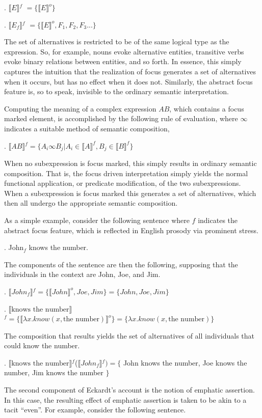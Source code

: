 \documentclass[12pt]{article}
\theoremstyle{definition} \newtheorem{definition}{Definition}
\newcommand{\la}{\ensuremath{\lambda}}
\newcommand{\inter}[1]{\ensuremath{\llbracket#1\rrbracket}}
\begin{document}
\ex. \inter{E}$^f$ $= \{\inter{E}^o\} $

\ex. \inter{E_f}$^f$ $= \{\inter{E}^o, F_1, F_2, F_3...\} $

The set of alternatives is restricted to be of the same logical type as the expression. So, for example, nouns evoke alternative entities, transitive verbs evoke binary relations between entities, and so forth. In essence, this simply captures the intuition that the realization of focus generates a set of alternatives when it occurs, but has no effect when it does not. Similarly, the abstract focus feature is, so to speak, invisible to the ordinary semantic interpretation.

Computing the meaning of a complex expression $AB$, which contains a focus marked element, is accomplished by the following  rule of evaluation, where $\infty$ indicates a suitable method of semantic composition, 

\ex. \inter{AB}$^f = \{ A_i \infty B_j | A_i \in \inter{A}^f, B_j \in \inter{B}^f \} $

When no subexpression is focus marked, this simply results in ordinary semantic composition. That is, the focus driven interpretation simply yields the normal functional application, or predicate modification, of the two subexpressions. When a subexpression is focus marked this generates a set of alternatives, which then all undergo the appropriate semantic composition.

As a simple example, consider the following sentence where $f$ indicates the abstract focus feature, which is reflected in English prosody via prominent stress.

\ex. John$_f$ knows the number.

The components of the sentence are then the following, supposing that the individuals in the context are John, Joe, and Jim.

\ex. \inter{John_f}$^f = \{ \inter{John}^o, Joe, Jim \} = \{ John, Joe, Jim \}$

\ex. \inter{\text{knows the number}}$^f = \{ \inter{\la x . know(x, \text{the number})}^o \} = \{ \la x . know(x, \text{the number}) \}$

The composition that results yields the set of alternatives of all individuals that could know the number.

\ex. \inter{\text{knows the number}}$^f$(\inter{John_f}$^f) = \{$ John knows the number, Joe knows the number, Jim knows the number $\}$


The second component of Eckardt's account is the notion of emphatic assertion. In this case, the resulting effect of emphatic assertion is taken to be akin to a tacit ``even''.  For example, consider the following sentence.
\end{document}
